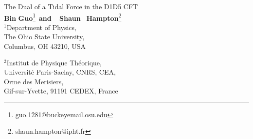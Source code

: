 \documentclass[11pt]{article}
\begin{document}
\begin{flushright}
\end{flushright}
\vspace{20mm}
\begin{center}
{\LARGE The Dual of a Tidal Force in the D1D5 CFT}
\\
\vspace{18mm}
\textbf{Bin} \textbf{Guo}{\footnote{guo.1281@buckeyemail.osu.edu}}~\textbf{and} ~ \textbf{Shaun}~  \textbf{Hampton}{\footnote{shaun.hampton@ipht.fr}}
\\
\vspace{10mm}
${}^1$Department of Physics,\\ The Ohio State University,\\ Columbus,
OH 43210, USA\\ \vspace{8mm}

${}^2$Institut de Physique Th\'eorique,\\
	Universit\'e Paris-Saclay,
	CNRS, CEA, \\ 	Orme des Merisiers,\\ Gif-sur-Yvette, 91191 CEDEX, France  \\

\vspace{8mm}
\end{center}

\vspace{4mm}


\thispagestyle{empty}
\begin{abstract}
It was demonstrated that a string probe falling radially within a superstratum geometry would experience tidal forces. These tidal forces were shown to excite the string by converting its kinetic energy into stringy excitations. Using the AdS/CFT correspondence we seek to understand this behavior from the perspective of the dual D1D5 CFT. To study this process we turn on an interaction of the theory which is described by a deformation operator. We start with an initial state which is dual to a graviton probe moving within the superstratum geometry. We then use two deformation operators to compute transition amplitudes between this state and a final state that corresponds to stringy excitations. We show that this amplitude grows as $t^2$ with $t$ being the amount of time for which the deformation operators are turned on. We argue that this process in the CFT is suggestive of the tidal effects experienced by the probe propagating within the dual superstratum geometry. 


\vspace{3mm}



\end{abstract}
\newpage
\end{document}

